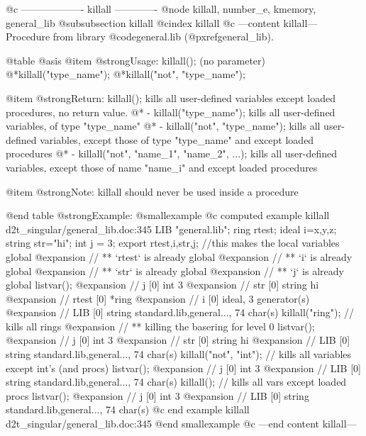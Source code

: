@c ------------------- killall -------------
@node killall, number_e, kmemory, general_lib
@subsubsection killall
@cindex killall
@c ---content killall---
Procedure from library @code{general.lib} (@pxref{general_lib}).

@table @asis
@item @strong{Usage:}
killall(); (no parameter)
@*killall("type_name");
@*killall("not", "type_name");

@item @strong{Return:}
killall(); kills all user-defined variables except loaded procedures,
no return value.
@* - killall("type_name"); kills all user-defined variables,
of type "type_name"
@* - killall("not", "type_name"); kills all user-defined variables,
except those of type "type_name" and except loaded procedures
@* - killall("not", "name_1", "name_2", ...);
kills all user-defined variables, except those of name "name_i"
and except loaded procedures

@item @strong{Note:}
killall should never be used inside a procedure

@end table
@strong{Example:}
@smallexample
@c computed example killall d2t_singular/general_lib.doc:345 
LIB "general.lib";
ring rtest; ideal i=x,y,z; string str="hi"; int j = 3;
export rtest,i,str,j;       //this makes the local variables global
@expansion{} // ** `rtest` is already global
@expansion{} // ** `i` is already global
@expansion{} // ** `str` is already global
@expansion{} // ** `j` is already global
listvar();
@expansion{} // j                    [0]  int 3
@expansion{} // str                  [0]  string hi
@expansion{} // rtest                [0]  *ring
@expansion{} //      i                    [0]  ideal, 3 generator(s)
@expansion{} // LIB                  [0]  string standard.lib,general..., 74 char(s)
killall("ring");            // kills all rings
@expansion{} // ** killing the basering for level 0
listvar();
@expansion{} // j                    [0]  int 3
@expansion{} // str                  [0]  string hi
@expansion{} // LIB                  [0]  string standard.lib,general..., 74 char(s)
killall("not", "int");      // kills all variables except int's (and procs)
listvar();
@expansion{} // j                    [0]  int 3
@expansion{} // LIB                  [0]  string standard.lib,general..., 74 char(s)
killall();                  // kills all vars except loaded procs
listvar();
@expansion{} // j                    [0]  int 3
@expansion{} // LIB                  [0]  string standard.lib,general..., 74 char(s)
@c end example killall d2t_singular/general_lib.doc:345
@end smallexample
@c ---end content killall---

